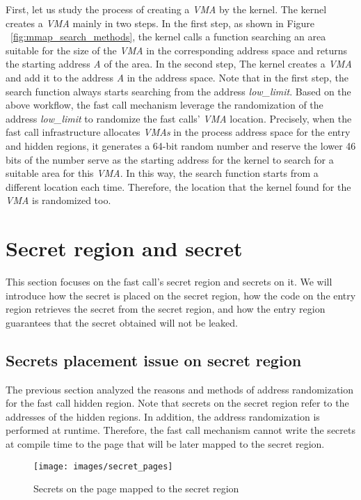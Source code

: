 First, let us study the process of creating a \emph{VMA} by the kernel. 
The kernel creates a \emph{VMA} mainly in two steps. In the first step, 
as shown in Figure ~\ref{fig:mmap_search_methods}, the kernel calls 
a function searching an area suitable for the size of the \emph{VMA}  in the corresponding 
address space and returns the starting address \emph{A} of the area. In the second step, 
The kernel creates a \emph{VMA} and add it to the address \emph{A} in the address space.  
Note that in the first step, the search 
function always starts searching from the address \emph{low\_limit}.
Based on the above workflow, the fast call mechanism leverage the randomization 
of the address \emph{low\_limit} to randomize the fast calls' \emph{VMA} location. Precisely,  
when the fast call infrastructure allocates \emph{VMAs} in the process address space for 
the entry and hidden regions, it generates a 64-bit random number and 
reserve the lower 46  bits of the number serve as the starting address for 
the kernel to search for a suitable area for this \emph{VMA}. In this way, the search 
function starts from a different location each time. Therefore,  the location 
that the kernel found for the \emph{VMA} is randomized too. 


\section{Secret region and secret}

This section focuses on the fast call's secret region and 
secrets on it. We will introduce how the secret is placed on the secret region, how the code on 
the entry region retrieves the secret from the secret region, 
and how the entry region guarantees that the secret obtained will not be leaked.

\subsection{Secrets placement issue on secret region}
The previous section analyzed the reasons and methods of address randomization 
for the fast call hidden region. Note that secrets on the secret region refer 
to the addresses of the hidden regions. In addition, the address randomization 
is performed at runtime. Therefore, the fast call mechanism cannot write the 
secrets at compile time to the page that will be later mapped to the secret region.

\begin{figure}[tbp]
  \centering
  \texttt{[image: images/secret\_pages]}
  \caption[Short description]{Secrets on the page mapped to the secret region}
  \label{fig:secret_pages}
\end{figure}

